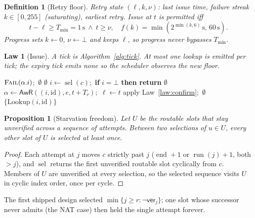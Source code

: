 \documentclass[journal]{IEEEtran}
\newtheorem{definition}{Definition}
\newtheorem{law}{Law}
\newtheorem{proposition}{Proposition}
\newcommand{\head}{\operatorname{head}}
\newcommand{\run}{\operatorname{run}}
\newcommand{\sel}{\operatorname{sel}}
\newcommand{\pend}{\operatorname{end}}
\newcommand{\ver}{\mathsf{ver}}
\newcommand{\Idle}{\mathsf{Idle}}
\newcommand{\AwR}{\mathsf{AwR}}
\newcommand{\Fail}{\textsc{Fail}}
\newcommand{\att}{\alpha}
\begin{document}
\begin{definition}[Retry floor]\label{def:retry}
Retry state $(\ell,k,\nu)$: last issue time, failure streak
$k\in[0,255]$ (saturating), earliest retry.  Issue at $t$ is permitted iff
\[
t-\ell\ge T_{\min}=1\,\mathrm{s}\ \wedge\ t\ge\nu,\quad
f(k)=\min(2^{\min(k,6)}\,\mathrm{s},\,60\,\mathrm{s}).
\]
Progress sets $k\gets0$, $\nu\gets\bot$ and keeps $\ell$, so progress never
bypasses $T_{\min}$.
\end{definition}

\begin{law}[Issue]\label{law:issue}
A tick is Algorithm~\ref{alg:tick}.  At most one lookup is emitted per
tick; the expiry tick emits none so the scheduler observes the new floor.
\end{law}

\begin{algorithm}[t]
\caption{Tick$(t,\mathrm{id})$: retire an expired attempt, else issue}
\label{alg:tick}
\begin{algorithmic}[1]
\If{$\att\ne\Idle\ \wedge\ t\ge\tau$} \State $\Fail(\att.i)$;\ \Return $\emptyset$ \EndIf
\If{$\att\ne\Idle\ \vee\ \forall j\,\ver_j\ \vee\ t-\ell<T_{\min}\ \vee\ t<\nu$} \State \Return $\emptyset$ \EndIf
\State $i\gets\sel(c)$;\ \textbf{if} $i=\bot$ \textbf{then return} $\emptyset$
\State $\att\gets\AwR((i,\mathrm{id}),e,t+T_r)$;\ $\ell\gets t$
\If{$t_i\in(n,\head(n)]$} \State apply Law~\ref{law:confirm};\ \Return $\emptyset$
\Else \State \Return $\{\mathrm{Lookup}(i,\mathrm{id})\}$ \EndIf
\end{algorithmic}
\end{algorithm}

\begin{proposition}[Starvation freedom]\label{prop:starve}
Let $U$ be the routable slots that stay unverified across a sequence of
attempts.  Between two selections of $u\in U$, every other slot of $U$ is
selected at least once.
\end{proposition}
\begin{proof}
Each attempt at $j$ moves $c$ strictly past $j$ ($\pend+1$ or $\run(j)+1$,
both $>j$), and $\sel$ returns the first unverified routable slot cyclically
from $c$.  Members of $U$ are unverified at every selection, so the
selected sequence visits $U$ in cyclic index order, once per cycle.
\end{proof}

The first shipped design selected $\min\{j\ge r:\neg\ver_j\}$; one slot
whose successor never admits (the NAT case) then held the single attempt
forever.
\end{document}
